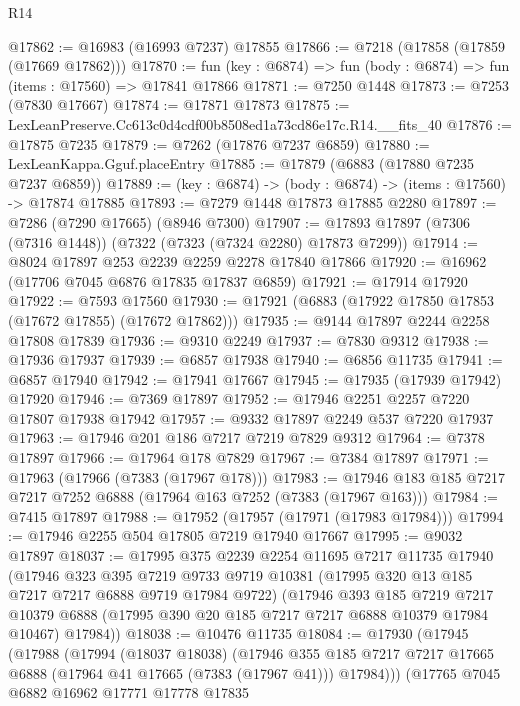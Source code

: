 \begin{lexlean}{R14}
\begin{coremodule}
@17862 := @16983 (@16993 @7237) @17855
@17866 := @7218 (@17858 (@17859 (@17669 @17862)))
@17870 := fun (key : @6874) => fun (body : @6874) => fun (items : @17560) => @17841 @17866
@17871 := @7250 @1448
@17873 := @7253 (@7830 @17667)
@17874 := @17871 @17873
@17875 := LexLeanPreserve.Cc613c0d4cdf00b8508ed1a73cd86e17c.R14.__fits_40
@17876 := @17875 @7235
@17879 := @7262 (@17876 @7237 @6859)
@17880 := LexLeanKappa.Gguf.placeEntry
@17885 := @17879 (@6883 (@17880 @7235 @7237 @6859))
@17889 := (key : @6874) -> (body : @6874) -> (items : @17560) -> @17874 @17885
@17893 := @7279 @1448 @17873 @17885 @2280
@17897 := @7286 (@7290 @17665) (@8946 @7300)
@17907 := @17893 @17897 (@7306 (@7316 @1448)) (@7322 (@7323 (@7324 @2280) @17873 @7299))
@17914 := @8024 @17897 @253 @2239 @2259 @2278 @17840 @17866
@17920 := @16962 (@17706 @7045 @6876 @17835 @17837 @6859)
@17921 := @17914 @17920
@17922 := @7593 @17560
@17930 := @17921 (@6883 (@17922 @17850 @17853 (@17672 @17855) (@17672 @17862)))
@17935 := @9144 @17897 @2244 @2258 @17808 @17839
@17936 := @9310 @2249
@17937 := @7830 @9312
@17938 := @17936 @17937
@17939 := @6857 @17938
@17940 := @6856 @11735
@17941 := @6857 @17940
@17942 := @17941 @17667
@17945 := @17935 (@17939 @17942) @17920
@17946 := @7369 @17897
@17952 := @17946 @2251 @2257 @7220 @17807 @17938 @17942
@17957 := @9332 @17897 @2249 @537 @7220 @17937
@17963 := @17946 @201 @186 @7217 @7219 @7829 @9312
@17964 := @7378 @17897
@17966 := @17964 @178 @7829
@17967 := @7384 @17897
@17971 := @17963 (@17966 (@7383 (@17967 @178)))
@17983 := @17946 @183 @185 @7217 @7217 @7252 @6888 (@17964 @163 @7252 (@7383 (@17967 @163)))
@17984 := @7415 @17897
@17988 := @17952 (@17957 (@17971 (@17983 @17984)))
@17994 := @17946 @2255 @504 @17805 @7219 @17940 @17667
@17995 := @9032 @17897
@18037 := @17995
    @375
    @2239
    @2254
    @11695
    @7217
    @11735
    @17940
    (@17946
      @323
      @395
      @7219
      @9733
      @9719
      @10381
      (@17995 @320 @13 @185 @7217 @7217 @6888 @9719 @17984 @9722)
      (@17946
        @393
        @185
        @7219
        @7217
        @10379
        @6888
        (@17995 @390 @20 @185 @7217 @7217 @6888 @10379 @17984 @10467)
        @17984))
@18038 := @10476 @11735
@18084 := @17930
    (@17945
      (@17988
        (@17994
          (@18037 @18038)
          (@17946
            @355
            @185
            @7217
            @7217
            @17665
            @6888
            (@17964 @41 @17665 (@7383 (@17967 @41)))
            @17984)))
      (@17765
        @7045
        @6882
        @16962
        @17771
        @17778
        @17835

\end{coremodule}
\end{lexlean}
